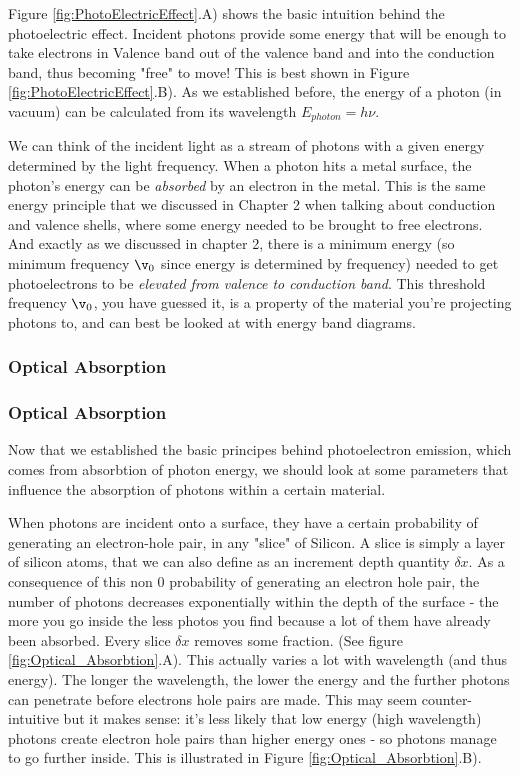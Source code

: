 Figure \ref{fig:PhotoElectricEffect}.A) shows the basic intuition behind the photoelectric effect. Incident photons provide some energy that will be enough to take electrons in Valence band out of the valence band and into the conduction band, thus becoming "free" to move! This is best shown in Figure \ref{fig:PhotoElectricEffect}.B). As we established before, the energy of a photon (in vacuum) can be calculated from its wavelength $E_{photon} = h \nu$. 

We can think of the incident light as a stream of photons with a given energy determined by the light frequency. When a photon hits a metal surface, the photon's energy can be \textit{absorbed} by an electron in the metal. This is the same energy principle that we discussed in Chapter 2 when talking about conduction and valence shells, where some energy needed to be brought to free electrons. And exactly as we discussed in chapter 2, there is a minimum energy (so minimum frequency $\v_0$ since energy is determined by frequency) needed to get photoelectrons to be \textit{elevated from valence to conduction band}.  This threshold frequency $\v_0$, you have guessed it, is a property of the material you're projecting photons to, and can best be looked at with energy band diagrams. 

\subsubsection{Optical Absorption}
\subsubsection{Optical Absorption}


Now that we established the basic principes behind photoelectron emission, which comes from absorbtion of photon energy, we should look at some parameters that influence the absorption of photons within a certain material.

When photons are incident onto a surface, they have a certain probability of generating an electron-hole pair, in any "slice" of Silicon. A slice is simply a layer of silicon atoms, that we can also define as an increment depth quantity $\delta x$. As a consequence of this non 0 probability of generating an electron hole pair, the number of photons decreases exponentially within the depth of the surface - the more you go inside the less photos you find because a lot of them have already been absorbed. Every slice $\delta x$ removes some fraction. (See figure \ref{fig:Optical_Absorbtion}.A). This actually varies a lot with wavelength (and thus energy). The longer the wavelength, the lower the energy and the further photons can penetrate before electrons hole pairs are made. This may seem counter-intuitive but it makes sense: it's less likely that low energy (high wavelength) photons create electron hole pairs than higher energy ones - so photons manage to go further inside. This is illustrated in Figure \ref{fig:Optical_Absorbtion}.B). 

